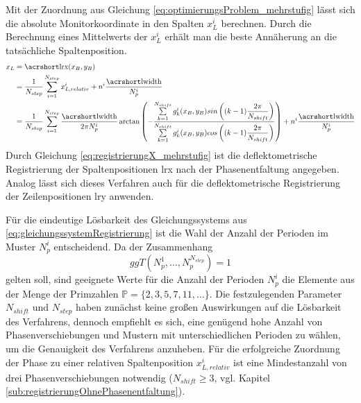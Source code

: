 \p
Mit der Zuordnung aus Gleichung \ref{eq:optimierungsProblem_mehrstufig} lässt sich die absolute Monitorkoordinate in den Spalten $x_L^i$ berechnen. 
Durch die Berechnung eines Mittelwerts der $x_L^i$ erhält man die beste Annäherung an die tatsächliche Spaltenposition.
%
\begin{equation}\label{eq:registrierungX_mehrstufig}
	\begin{split}
		x_L
		& =
			\acrshortmath{lrx}(x_B, y_B)\\
		& =
			\dfrac{1}{N_{step}}
			\sum\limits_{i = 1}^{N_{step}}
			x_{L,relativ}^i + n^i \dfrac{\acrshortmath{lwidth}}{N_p^i}\\
		& =
			\dfrac{1}{N_{step}}
			\sum\limits_{i = 1}^{N_{step}}
			\dfrac{\acrshortmath{lwidth}}{2\pi N_p^i}
			\arctan
			\left(
				-\dfrac
				{\sum\limits_{k=1}^{N_{shift}} g_k^i(x_B, y_B) sin\left((k - 1)\dfrac{2\pi}{N_{shift}}\right)}
				{\sum\limits_{k=1}^{N_{shift}} g_k^i(x_B, y_B) cos\left((k - 1)\dfrac{2\pi}{N_{shift}}\right)}
			\right)
			+ n^i \dfrac{\acrshortmath{lwidth}}{N_p^i}
	\end{split}
\end{equation}
%
Durch Gleichung \ref{eq:registrierungX_mehrstufig} ist die deflektometrische Registrierung der Spaltenpositionen \acrshort{lrx} nach der Phasenentfaltung angegeben.
Analog lässt sich dieses Verfahren auch für die deflektometrische Registrierung der Zeilenpositionen \acrshort{lry} anwenden.

\p
Für die eindeutige Lösbarkeit des Gleichungssystems aus \ref{eq:gleichungssystemRegistrierung} ist die Wahl der Anzahl der Perioden im Muster $N_p^i$ entscheidend.
Da der Zusammenhang
%
\begin{equation*}
	ggT(N_p^1, \ldots, N_p^{N_{step}}) = 1
\end{equation*}
%
gelten soll, sind geeignete Werte für die Anzahl der Perioden $N_p^i$ die Elemente aus der Menge der Primzahlen $\mathbb{P} = \lbrace 2, 3, 5, 7, 11,\ldots\rbrace$.
Die festzulegenden Parameter $N_{shift}$ und $N_{step}$ haben zunächst keine großen Auswirkungen auf die Lösbarkeit des Verfahrens, dennoch empfiehlt es sich, eine genügend hohe Anzahl von Phasenverschiebungen und Mustern mit unterschiedlichen Perioden zu wählen, um die Genauigkeit des Verfahrens anzuheben.
Für die erfolgreiche Zuordnung der Phase zu einer relativen Spaltenposition $x_{L,relativ}^i$ ist eine Mindestanzahl von drei Phasenverschiebungen notwendig ($N_{shift} \geq 3$, vgl. Kapitel \ref{sub:registrierungOhnePhasenentfaltung}). 

